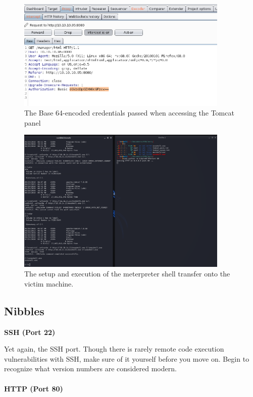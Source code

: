 \documentclass[a4paper,11pt]{article}
\begin{document}
\begin{figure}[h]
    \centering
    \includegraphics[width=0.9\textwidth]{images/base64burp.png}
    \caption{The Base 64-encoded credentials passed when accessing the Tomcat panel}
\end{figure}
\begin{figure}[h]
    \centering
    \includegraphics[width=0.9\textwidth]{images/certutil-trickery.png}
    \caption{The setup and execution of the meterpreter shell transfer onto the victim machine.}
    \vspace{-4cm}
\end{figure}
\pagebreak

\begin{center}
\subsection{Nibbles}
\end{center}

{\bfseries SSH (Port 22)}

Yet again, the SSH port. Though there is rarely remote code execution vulnerabilities with SSH, make sure of it yourself before you move on. Begin to recognize what version numbers are considered modern.
\\
\\
{\bfseries HTTP (Port 80)}
\end{document}
